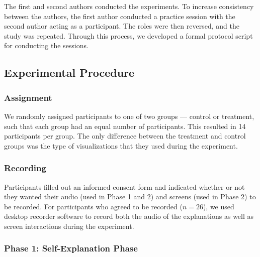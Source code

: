 \documentclass[conference]{IEEEtran}
\begin{document}
The first and second authors conducted the experiments. To increase consistency between the authors, the first author conducted a practice session with the second author acting as a participant. The roles were then reversed, and the study was repeated. Through this process, we developed a formal protocol script for conducting the sessions.

\subsection{Experimental Procedure}


\subsubsection{Assignment}
We randomly assigned participants to one of two groups --- control or treatment, such that each group had an equal number of participants. This resulted in 14 participants per group. The only difference between the treatment and control groups was the type of visualizations that they used during the experiment.

\subsubsection{Recording}
Participants filled out an informed consent form and indicated whether or not they wanted their audio (used in Phase 1 and 2) and screens (used in Phase 2) to be recorded. For participants who agreed to be recorded ($n=26$), we used desktop recorder software to record both the audio of the explanations as well as screen interactions during the experiment.

\subsubsection{Phase 1: Self-Explanation Phase}

\end{document}

